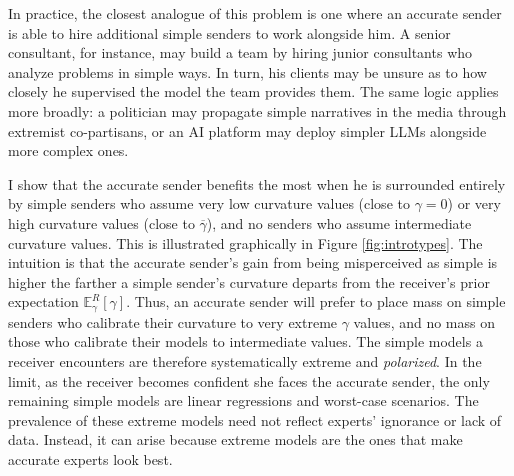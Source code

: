 \documentclass[11pt,dvipsnames]{article}
\begin{document}
In practice, the closest analogue of this problem is one where an accurate sender is able to hire additional simple senders to work alongside him.
A senior consultant, for instance, may build a team by hiring junior consultants who analyze problems in simple ways. In turn, his clients may be unsure as to how closely he supervised the model the team provides them.
The same logic applies more broadly: a politician may propagate simple narratives in the media through extremist co-partisans, or an AI platform may deploy simpler LLMs alongside more complex ones.

I show that the accurate sender benefits the most when he is surrounded entirely by simple senders who assume very low curvature values (close to $\gamma=0$) or very high curvature values (close to $\overline{\gamma}$), and no senders who assume intermediate curvature values.
This is illustrated graphically in Figure \ref{fig:introtypes}.
The intuition is that the accurate sender's gain from being misperceived as simple is higher the farther a simple sender's curvature departs from the receiver's prior expectation $\mathbb{E}_\gamma^R[\gamma]$.
Thus, an accurate sender will prefer to place mass on simple senders who calibrate their curvature to very extreme $\gamma$ values, and no mass on those who calibrate their models to intermediate values.
The simple models a receiver encounters are therefore systematically extreme and \emph{polarized}.
In the limit, as the receiver becomes confident she faces the accurate sender, the only remaining simple models are linear regressions and worst-case scenarios.
The prevalence of these extreme models need not reflect experts' ignorance or lack of data.
Instead, it can arise because extreme models are the ones that make accurate experts look best.
\end{document}
